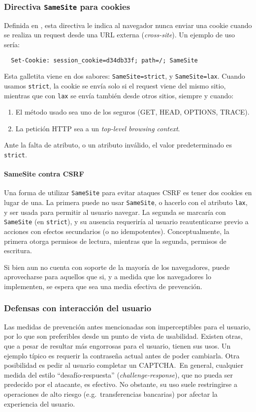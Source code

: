 \documentclass{article}
\theoremstyle{definition}
\begin{document}
\subsubsection{Directiva \texttt{SameSite} para cookies}
Definida en \cite{ietf}, esta directiva le indica al navegador nunca enviar una cookie cuando se realiza
un request desde una URL externa (\textit{cross-site}). Un ejemplo de uso sería:
\begin{verbatim}
  Set-Cookie: session_cookie=d34db33f; path=/; SameSite
\end{verbatim}

Esta galletita viene en dos sabores: \verb+SameSite=strict+, y
\verb+SameSite=lax+. Cuando usamos \verb+strict+, la cookie se envía solo si el request viene del
mismo sitio, mientras que con \verb+lax+ se envía también desde otros sitios,
siempre y cuando:
\begin{enumerate}
  \item El método usado sea uno de los seguros (GET, HEAD, OPTIONS, TRACE).
  \item La petición HTTP sea a un \textit{top-level browsing context}.
\end{enumerate}
Ante la falta de atributo, o un atributo inválido, el valor predeterminado es
\verb+strict+.

\paragraph{SameSite contra CSRF} Una forma de utilizar \verb+SameSite+ para
evitar ataques CSRF es tener dos cookies en lugar de una. La primera puede no
usar \verb+SameSite+, o hacerlo con el atributo \verb+lax+, y ser usada para
permitir al usuario navegar. La segunda se marcaría con \verb+SameSite+ (en
\verb+strict+), y su ausencia requeriría al usuario reautenticarse previo a
acciones con efectos secundarios (o no idempotentes). Conceptualmente, la
primera otorga permisos de lectura, mientras que la segunda, permisos de
escritura.

Si bien aun no cuenta con soporte de la mayoría de los navegadores, puede
aprovecharse para aquellos que si, y a medida que los navegadores lo
implementen, se espera que sea una media efectiva de prevención.

\subsubsection{Defensas con interacción del usuario}
Las medidas de prevención antes mencionadas son imperceptibles para el usuario,
por lo que son preferibles desde un punto de vista de usabilidad. Existen otras,
que a pesar de resultar más engorrosas para el usuario, tienen sus usos. Un
ejemplo típico es requerir la contraseña actual antes de poder cambiarla. Otra
posibilidad es pedir al usuario completar un CAPTCHA.\ En general, cualquier
medida del estilo ``desafío-respuesta'' (\textit{challenge-response}), que no
pueda ser predecido por el atacante, es efectivo. No obstante, su uso suele
restringirse a operaciones de alto riesgo (e.g.\ transferencias bancarias) por afectar la
experiencia del usuario.
\end{document}
